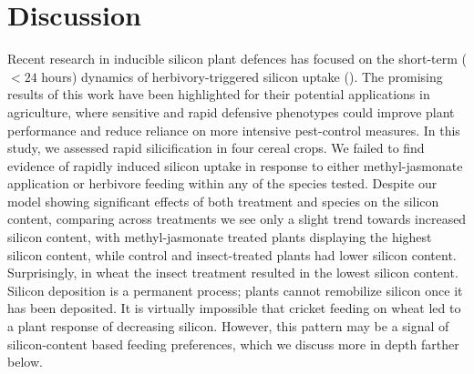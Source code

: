 \documentclass[12pt, letterpaper]{report}
\begin{document}
\section{Discussion}

Recent research in inducible silicon plant defences has focused on the short-term ($<24$ hours) dynamics of herbivory-triggered silicon uptake (\cite{waterman_short-term_2021,waterman_short-term_2021-1}). The promising results of this work have been highlighted for their potential applications in agriculture, where sensitive and rapid defensive phenotypes could improve plant performance and reduce reliance on more intensive pest-control measures. In this study, we assessed rapid silicification in four cereal crops. We failed to find evidence of rapidly induced silicon uptake in response to either methyl-jasmonate application or herbivore feeding within any of the species tested. Despite our model showing significant effects of both treatment and species on the silicon content, comparing across treatments we see only a slight trend towards increased silicon content, with methyl-jasmonate treated plants displaying the highest silicon content, while control and insect-treated plants had lower silicon content. Surprisingly, in wheat the insect treatment resulted in the lowest silicon content. Silicon deposition is a permanent process; plants cannot remobilize silicon once it has been deposited. It is virtually impossible that cricket feeding on wheat led to a plant response of decreasing silicon. However, this pattern may be a signal of silicon-content based feeding preferences, which we discuss more in depth farther below.
\end{document}
